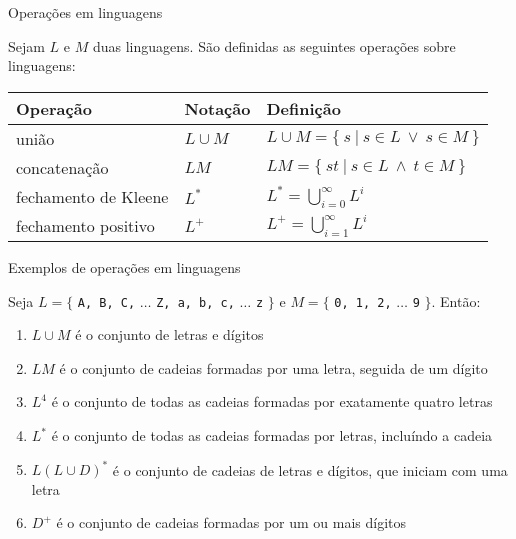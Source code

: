 \begin{frame}[fragile]{Operações em linguagens}

    Sejam $L$ e $M$ duas linguagens. São definidas as seguintes operações sobre linguagens:
    \vspace{0.2in}

    \begin{tabularx}{0.95\textwidth}{llX}
        \toprule
        \textbf{Operação} & \textbf{Notação} & \textbf{Definição} \\
        \midrule
        união & $L\cup M$ & $L\cup M = \{\ s\ |\ s\in L\ \vee\ s\in M\ \}$ \\
        \rowcolor[gray]{0.9}
        concatenação & $LM$ & $LM = \{\ st\ |\ s\in L\ \land\ t\in M\ \}$ \\
        fechamento de Kleene & $\displaystyle L^*$ & $\displaystyle L^* = \bigcup_{i = 0}^\infty L^i$ \\
        \rowcolor[gray]{0.9}
        fechamento positivo & $L^+$ & $\displaystyle L^+ = \bigcup_{i = 1}^\infty L^i$ \\
        \bottomrule
    \end{tabularx}

\end{frame}

\begin{frame}[fragile]{Exemplos de operações em linguagens}

    Seja $L = \{$ \texttt{A, B, C,} $\ldots$ \texttt{Z, a, b, c,} $\ldots$ \texttt{z} $\}$ e $M = \{$ \texttt{0, 1, 2,} $\ldots$ \texttt{9} $\}$. Então:
    \vspace{0.2in}

    \begin{enumerate}
        \item $L\cup M$ é o conjunto de letras e dígitos

        \item $LM$ é o conjunto de cadeias formadas por uma letra, seguida de um dígito

        \item $L^4$ é o conjunto de todas as cadeias formadas por exatamente quatro letras

        \item $L^*$ é o conjunto de todas as cadeias formadas por letras, incluíndo a cadeia 

        \item $L(L\cup D)^*$ é o conjunto de cadeias de letras e dígitos, que iniciam com uma letra

        \item $D^+$ é o conjunto de cadeias formadas por um ou mais dígitos
    \end{enumerate}

\end{frame}


